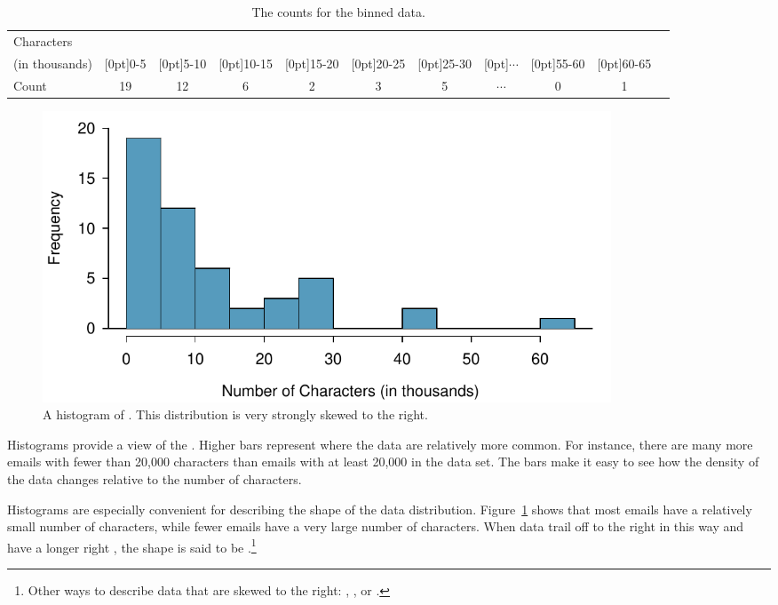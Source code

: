 \begin{doublespace}
\begin{table}[ht]
	\centering\small
	\begin{tabular}{l ccc ccc ccc c}
		\hline
		Characters & \\
		(in thousands) & \raisebox{1.5ex}[0pt]{0-5} & \raisebox{1.5ex}[0pt]{5-10} & \raisebox{1.5ex}[0pt]{10-15} & \raisebox{1.5ex}[0pt]{15-20} & \raisebox{1.5ex}[0pt]{20-25} & \raisebox{1.5ex}[0pt]{25-30} & \raisebox{1.5ex}[0pt]{$\cdots$} & \raisebox{1.5ex}[0pt]{55-60} & \raisebox{1.5ex}[0pt]{60-65} \\
		\hline
		Count & 19 & 12 & 6 & 2 & 3 & 5 & $\cdots$ & 0 & 1 \\
		\hline
	\end{tabular}
	\caption{The counts for the binned  data.}
	\label{binnedNumCharTable}
\end{table}

\begin{figure}[bth]
	\centering
	\includegraphics[width=0.82\textwidth]{ch_intro_to_data_oi_biostat/figures/email50NumCharHist/email50NumCharHist}
	\caption{A histogram of . This distribution is very strongly skewed to the right.}
	\label{email50NumCharHist}
\end{figure}

Histograms provide a view of the . Higher bars represent where the data are relatively more common. For instance, there are many more emails with fewer than 20,000 characters than emails with at least 20,000 in the data set. The bars make it easy to see how the density of the data changes relative to the number of characters.

Histograms are especially convenient for describing the shape of the data distribution\label{shapeFirstDiscussed}. Figure~\ref{email50NumCharHist} shows that most emails have a relatively small number of characters, while fewer emails have a very large number of characters. When data trail off to the right in this way and have a longer right , the shape is said to be .\footnote{Other ways to describe data that are skewed to the right: , , or .}


\end{doublespace}
